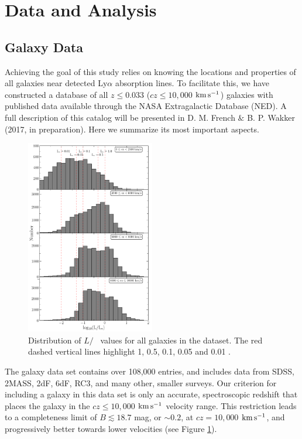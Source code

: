 \section{Data and Analysis}

\subsection{Galaxy Data}
Achieving the goal of this study relies on knowing the locations and properties of all galaxies near detected Ly$\alpha$ absorption lines. To facilitate this, we have constructed a database of all $z\leq 0.033$ ($cz\leq 10,000$ $\rm km\, s^{-1}$) galaxies with published data available through the NASA Extragalactic Database (NED). A full description of this catalog will be presented in D. M. French $\&$ B. P. Wakker (2017, in preparation). Here we summarize its most important aspects.

\begin{figure}[b!]
        \centering
        \vspace{0pt}
        \includegraphics[width=0.50\textwidth]{Chap3/figures/fig1.pdf}
        \caption{\small{Distribution of $L/$\Lstar~ values for all galaxies in the dataset. The red dashed vertical lines highlight 1, 0.5, 0.1, 0.05 and 0.01 \Lstar.}}
        \label{completeness}
\end{figure} 

The galaxy data set contains over 108,000 entries, and includes data from SDSS, 2MASS, 2dF, 6dF, RC3, and many other, smaller surveys. Our criterion for including a galaxy in this data set is only an accurate, spectroscopic redshift that places the galaxy in the $cz \leq 10,000$ $\rm km\, s^{-1}$ velocity range. This restriction leads to a completeness limit of $B \lesssim 18.7$ mag, or $\sim0.2 $\Lstar, at $cz = 10,000$ $\rm km\, s^{-1}$, and progressively better towards lower velocities (see Figure \ref{completeness}). 

